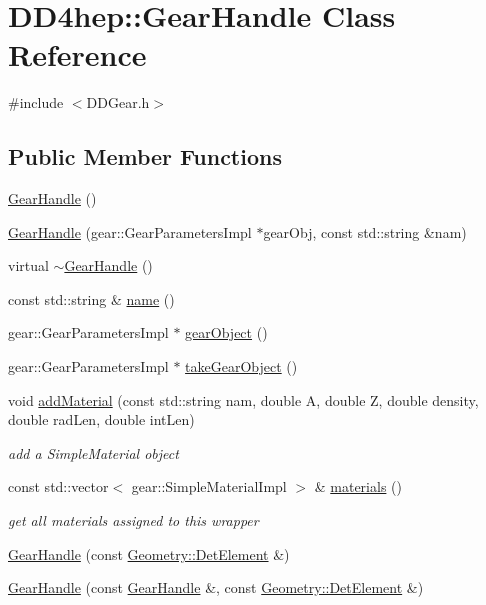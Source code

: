 \hypertarget{class_d_d4hep_1_1_gear_handle}{}\section{D\+D4hep\+:\+:Gear\+Handle Class Reference}
\label{class_d_d4hep_1_1_gear_handle}


{\ttfamily \#include $<$D\+D\+Gear.\+h$>$}

\subsection*{Public Member Functions}
\begin{DoxyCompactItemize}
\item 
\hyperlink{class_d_d4hep_1_1_gear_handle_a782739bfe116441082e6b4597bb6bf6e}{Gear\+Handle} ()
\item 
\hyperlink{class_d_d4hep_1_1_gear_handle_adeb098c8edf707d3d122de032ff476fd}{Gear\+Handle} (gear\+::\+Gear\+Parameters\+Impl $\ast$gear\+Obj, const std\+::string \&nam)
\item 
virtual \hyperlink{class_d_d4hep_1_1_gear_handle_a7b8b36839e741d9d3e4bb22f44262f01}{$\sim$\+Gear\+Handle} ()
\item 
const std\+::string \& \hyperlink{class_d_d4hep_1_1_gear_handle_acb3a333f73bd074c0d91bc453ae85cc0}{name} ()
\item 
gear\+::\+Gear\+Parameters\+Impl $\ast$ \hyperlink{class_d_d4hep_1_1_gear_handle_aaa9e8fbe619ab3a1a45fac04773e6c9a}{gear\+Object} ()
\item 
gear\+::\+Gear\+Parameters\+Impl $\ast$ \hyperlink{class_d_d4hep_1_1_gear_handle_a6dc3d8b5eaadccd2a6fa8c8e31739cbd}{take\+Gear\+Object} ()
\item 
void \hyperlink{class_d_d4hep_1_1_gear_handle_ae5f3ea169e473f5f0bd46f8d27d5d170}{add\+Material} (const std\+::string nam, double A, double Z, double density, double rad\+Len, double int\+Len)
\begin{DoxyCompactList}\small\item\em add a Simple\+Material object \end{DoxyCompactList}\item 
const std\+::vector$<$ gear\+::\+Simple\+Material\+Impl $>$ \& \hyperlink{class_d_d4hep_1_1_gear_handle_ae127a028091e597d755f33c1d1303032}{materials} ()
\begin{DoxyCompactList}\small\item\em get all materials assigned to this wrapper \end{DoxyCompactList}\item 
\hyperlink{class_d_d4hep_1_1_gear_handle_a08d410c5f9ea89384c3166fe42f0bae8}{Gear\+Handle} (const \hyperlink{class_d_d4hep_1_1_geometry_1_1_det_element}{Geometry\+::\+Det\+Element} \&)
\item 
\hyperlink{class_d_d4hep_1_1_gear_handle_a7b88ea01bf9e0fb58e7df2997c8825fb}{Gear\+Handle} (const \hyperlink{class_d_d4hep_1_1_gear_handle}{Gear\+Handle} \&, const \hyperlink{class_d_d4hep_1_1_geometry_1_1_det_element}{Geometry\+::\+Det\+Element} \&)
\end{DoxyCompactItemize}
